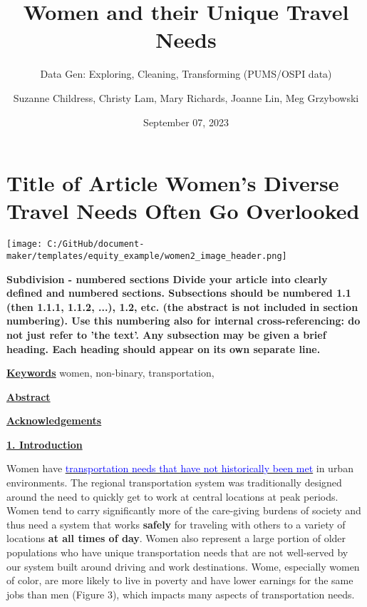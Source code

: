 \documentclass[
  12pt,
]{article}
\title{Women and their Unique Travel Needs}
\subtitle{Data Gen: Exploring, Cleaning, Transforming (PUMS/OSPI data)}
\author{Suzanne Childress, Christy Lam, Mary Richards, Joanne Lin, Meg
Grzybowski}
\date{September 07, 2023}
\begin{document}
\maketitle

\hypertarget{title-of-article-womens-diverse-travel-needs-often-go-overlooked}{%
\section{Title of Article Women's Diverse Travel Needs Often Go
Overlooked}\label{title-of-article-womens-diverse-travel-needs-often-go-overlooked}}

\onehalfspacing

\texttt{[image: C:/GitHub/document-maker/templates/equity\_example/women2\_image\_header.png]}

\thispagestyle{firstpage}

\begin{flushleft}

\textbf{Subdivision - numbered sections
Divide your article into clearly defined and numbered sections. Subsections should be numbered 1.1 (then 1.1.1, 1.1.2, ...), 1.2, etc. (the abstract is not included in section numbering). Use this numbering also for internal cross-referencing: do not just refer to 'the text'. Any subsection may be given a brief heading. Each heading should appear on its own separate line.}

{\underline{\textbf{Keywords}}} women, non-binary, transportation, 

{\underline{\textbf{Abstract}}}

{\underline{\textbf{Acknowledgements}}}

{\underline{\textbf{1. Introduction}}}

Women have \href{http://libraryarchives.metro.net/DB_Attachments/2019-0294/UnderstandingHowWomenTravel_FullReport_FINAL.pdf}{\underline{\textcolor{blue}{transportation needs that have not historically been met}}} in urban environments.  The regional transportation system was traditionally designed around the need to quickly get to work at central locations at peak periods. Women tend to carry significantly more of the care-giving burdens of society and thus need a system that works \textbf{safely} for traveling with others to a variety of locations \textbf{at all times of day}. Women also represent a large portion of older populations who have unique transportation needs that are not well-served by our system built around driving and work destinations. Wome, especially women of color, are more likely to live in poverty and have lower earnings for the same jobs than men (Figure 3), which impacts many aspects of transportation needs.
\end{flushleft}
\end{document}
